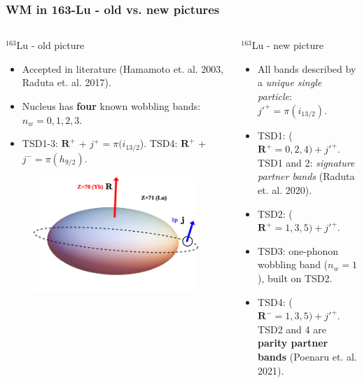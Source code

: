 \documentclass[
	11pt, %
]{beamer}
\begin{document}
\begin{frame}
	\frametitle{WM in 163-Lu - old vs. new pictures}
		\begin{columns}
			\begin{column}{0.5\textwidth}
				\vspace{-0.3cm}
				\begin{block}{$^{163}$Lu - old picture}
					\begin{itemize}
						\item Accepted in literature (Hamamoto et. al. 2003, Raduta et. al. 2017).
						\item Nucleus has \textbf{four} known wobbling bands: $n_w=0,1,2,3$.
						\item TSD1-3: $\mathbf{R}^+$ + $j^+=\pi(i_{13/2}$). TSD4: $\mathbf{R}^+$ + $j^-=\pi(h_{9/2})$.
					\end{itemize}
				\end{block}
				\begin{figure}
					\vspace{-0.4cm}
					\includegraphics[scale=0.12]{figures/triaxial-shapes-oddA-2.png}
				\end{figure}
			\end{column}
			\vspace{0.5cm}
			\begin{column}{0.5\textwidth}
				\begin{alertblock}{$^{163}$Lu - new picture}
					\begin{itemize}
						\item All bands described by a \emph{unique single particle}: $j'^+=\pi(i_{13/2})$.
						\item TSD1: ($\mathbf{R}^+=0,2,4)+j'^+$. TSD1 and 2: \emph{signature partner bands} (Raduta et. al. 2020).
						\item TSD2: ($\mathbf{R}^+=1,3,5)+j'^+$.
						\item TSD3: one-phonon wobbling band ($n_w=1$), built on TSD2.
						\item TSD4: ($\mathbf{R}^-=1,3,5)+j'^+$. TSD2 and 4 are \textbf{parity partner bands} (Poenaru et. al. 2021).
					\end{itemize}
				\end{alertblock}
			\end{column}
		\end{columns}
\end{frame}
\end{document}
